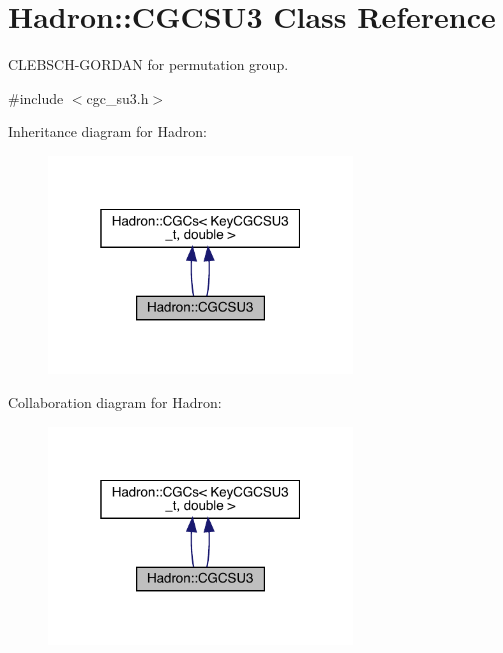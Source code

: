 \hypertarget{classHadron_1_1CGCSU3}{}\section{Hadron\+:\+:C\+G\+C\+S\+U3 Class Reference}
\label{classHadron_1_1CGCSU3}


C\+L\+E\+B\+S\+C\+H-\/\+G\+O\+R\+D\+AN for permutation group.  




{\ttfamily \#include $<$cgc\+\_\+su3.\+h$>$}



Inheritance diagram for Hadron\+:\nopagebreak
\begin{figure}[H]
\begin{center}
\leavevmode
\includegraphics[width=229pt]{dd/d57/classHadron_1_1CGCSU3__inherit__graph}
\end{center}
\end{figure}


Collaboration diagram for Hadron\+:\nopagebreak
\begin{figure}[H]
\begin{center}
\leavevmode
\includegraphics[width=229pt]{d0/d57/classHadron_1_1CGCSU3__coll__graph}
\end{center}
\end{figure}
